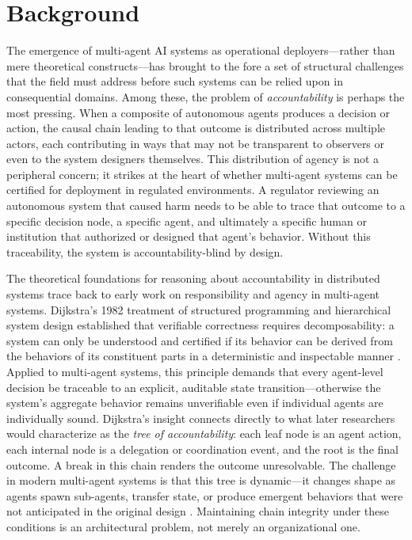 \section{Background}

The emergence of multi-agent AI systems as operational deployers—rather than mere theoretical constructs—has brought to the fore a set of structural challenges that the field must address before such systems can be relied upon in consequential domains. Among these, the problem of \emph{accountability} is perhaps the most pressing. When a composite of autonomous agents produces a decision or action, the causal chain leading to that outcome is distributed across multiple actors, each contributing in ways that may not be transparent to observers or even to the system designers themselves. This distribution of agency is not a peripheral concern; it strikes at the heart of whether multi-agent systems can be certified for deployment in regulated environments. A regulator reviewing an autonomous system that caused harm needs to be able to trace that outcome to a specific decision node, a specific agent, and ultimately a specific human or institution that authorized or designed that agent's behavior. Without this traceability, the system is accountability-blind by design.

The theoretical foundations for reasoning about accountability in distributed systems trace back to early work on responsibility and agency in multi-agent systems. Dijkstra's 1982 treatment of structured programming and hierarchical system design established that verifiable correctness requires decomposability: a system can only be understood and certified if its behavior can be derived from the behaviors of its constituent parts in a deterministic and inspectable manner \cite{dijkstra1982}. Applied to multi-agent systems, this principle demands that every agent-level decision be traceable to an explicit, auditable state transition—otherwise the system's aggregate behavior remains unverifiable even if individual agents are individually sound. Dijkstra's insight connects directly to what later researchers would characterize as the \emph{tree of accountability}: each leaf node is an agent action, each internal node is a delegation or coordination event, and the root is the final outcome. A break in this chain renders the outcome unresolvable. The challenge in modern multi-agent systems is that this tree is dynamic—it changes shape as agents spawn sub-agents, transfer state, or produce emergent behaviors that were not anticipated in the original design \cite{bansal2019}. Maintaining chain integrity under these conditions is an architectural problem, not merely an organizational one.

